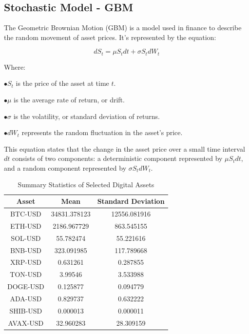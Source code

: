 \documentclass{ledger}
\begin{document}
\subsection{Stochastic Model - GBM}

\hfill \break

The Geometric Brownian Motion (GBM) is a model used in finance to describe the random movement of asset prices. It's represented by the equation:

\[
dS_t = \mu S_t dt + \sigma S_t dW_t
\]

Where:

$ \bullet S_t $ is the price of the asset at time $ t $.
 
$ \bullet \mu $ is the average rate of return, or drift.

$ \bullet \sigma $ is the volatility, or standard deviation of returns.

$ \bullet dW_t $ represents the random fluctuation in the asset's price.

\hfill \break

This equation states that the change in the asset price over a small time interval \( dt \) consists of two components: a deterministic component represented by \( \mu S_t dt \), and a random component represented by \( \sigma S_t dW_t \).



\begin{table}[h]
    \centering
    \begin{tabular}{ccc}
         \toprule
         \textbf{Asset} & \textbf{Mean} & \textbf{Standard Deviation} \\
         \midrule
         BTC-USD & 34831.378123 & 12556.081916 \\
         ETH-USD & 2186.967729 & 863.545155 \\
         SOL-USD & 55.782474 & 55.221616 \\
         BNB-USD & 323.091985 & 117.789668 \\
         XRP-USD & 0.631261 & 0.287855 \\
         TON-USD & 3.99546 & 3.533988 \\
         DOGE-USD & 0.125877 & 0.094779 \\
         ADA-USD & 0.829737 & 0.632222 \\
         SHIB-USD & 0.000013 & 0.000011 \\
         AVAX-USD & 32.960283 & 28.309159 \\
         \bottomrule
    \end{tabular}
    \caption{Summary Statistics of Selected Digital Assets}
    \label{tab:summary_stats}
\end{table}
\end{document}
